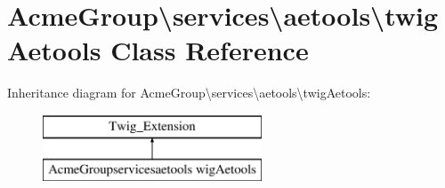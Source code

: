 \hypertarget{class_acme_group_1_1services_1_1aetools_1_1twig_aetools}{\section{Acme\+Group\textbackslash{}services\textbackslash{}aetools\textbackslash{}twig\+Aetools Class Reference}
\label{class_acme_group_1_1services_1_1aetools_1_1twig_aetools}
}
Inheritance diagram for Acme\+Group\textbackslash{}services\textbackslash{}aetools\textbackslash{}twig\+Aetools\+:\begin{figure}[H]
\begin{center}
\leavevmode
\includegraphics[height=2.000000cm]{class_acme_group_1_1services_1_1aetools_1_1twig_aetools}
\end{center}
\end{figure}
